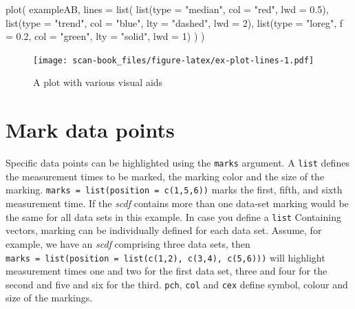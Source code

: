 \documentclass[
]{book}
\newenvironment{Shaded}{\begin{snugshade}}{\end{snugshade}}
\newcommand{\AttributeTok}[1]{\textcolor[rgb]{0.77,0.63,0.00}{#1}}
\newcommand{\DecValTok}[1]{\textcolor[rgb]{0.00,0.00,0.81}{#1}}
\newcommand{\FloatTok}[1]{\textcolor[rgb]{0.00,0.00,0.81}{#1}}
\newcommand{\FunctionTok}[1]{\textcolor[rgb]{0.00,0.00,0.00}{#1}}
\newcommand{\NormalTok}[1]{#1}
\newcommand{\StringTok}[1]{\textcolor[rgb]{0.31,0.60,0.02}{#1}}
\begin{document}
\begin{Shaded}
\begin{Highlighting}[]
\FunctionTok{plot}\NormalTok{(}
\NormalTok{  exampleAB, }
  \AttributeTok{lines =} \FunctionTok{list}\NormalTok{(}
    \FunctionTok{list}\NormalTok{(}\AttributeTok{type =} \StringTok{"median"}\NormalTok{, }\AttributeTok{col =} \StringTok{"red"}\NormalTok{, }\AttributeTok{lwd =} \FloatTok{0.5}\NormalTok{),}
    \FunctionTok{list}\NormalTok{(}\AttributeTok{type =} \StringTok{"trend"}\NormalTok{, }\AttributeTok{col =} \StringTok{"blue"}\NormalTok{, }\AttributeTok{lty =} \StringTok{"dashed"}\NormalTok{, }\AttributeTok{lwd =} \DecValTok{2}\NormalTok{),}
    \FunctionTok{list}\NormalTok{(}\AttributeTok{type =} \StringTok{"loreg"}\NormalTok{, }\AttributeTok{f =} \FloatTok{0.2}\NormalTok{, }\AttributeTok{col =} \StringTok{"green"}\NormalTok{, }\AttributeTok{lty =} \StringTok{"solid"}\NormalTok{, }\AttributeTok{lwd =} \DecValTok{1}\NormalTok{)}
\NormalTok{  )}
\NormalTok{)}
\end{Highlighting}
\end{Shaded}

\begin{figure}
\centering
\texttt{[image: scan-book\_files/figure-latex/ex-plot-lines-1.pdf]}
\caption{\label{fig:ex-plot-lines}A plot with various visual aids}
\end{figure}

\hypertarget{mark-data-points}{%
\section{Mark data points}\label{mark-data-points}}

Specific data points can be highlighted using the \texttt{marks} argument. A \texttt{list} defines the measurement times to be marked, the marking color and the size of the marking. \texttt{marks\ =\ list(position\ =\ c(1,5,6))} marks the first, fifth, and sixth measurement time. If the \emph{scdf} contains more than one data-set marking would be the same for all data sets in this example. In case you define a \texttt{list} Containing vectors, marking can be individually defined for each data set. Assume, for example, we have an \emph{scdf} comprising three data sets, then \texttt{marks\ =\ list(position\ =\ list(c(1,2),\ c(3,4),\ c(5,6)))} will highlight measurement times one and two for the first data set, three and four for the second and five and six for the third. \texttt{pch}, \texttt{col} and \texttt{cex} define symbol, colour and size of the markings.
\end{document}
